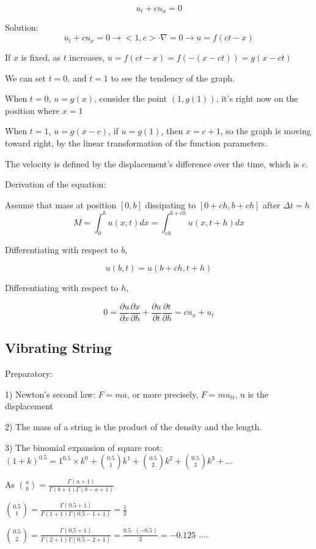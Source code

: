 \documentclass{article}
\begin{document}
$$u_t + cu_x = 0 $$

Solution:
$$u_t + cu_x = 0 \rightarrow <1,c> \cdot \nabla = 0 \rightarrow u = f(ct-x)$$

If $x$ is fixed, as $t$ increases, $u=f(ct-x) = f(-(x-ct)) = g(x-ct)$

We can set $t=0$, and $t = 1$ to see the tendency of the graph.

When $t =0$, $u = g(x)$, consider the point $(1,g(1))$, it's right now on the position where $x=1$

When $t =1$, $u = g(x-c)$, if $u = g(1)$, then $x = c+1$, so the graph is moving toward right, by the linear transformation of the function parameters.

The velocity is defined by the displacement's difference over the time, which is $c$.

Derivation of the equation:

Assume that mass at position $[0,b]$ dissipating to $[0+ch,b+ch]$ after $\Delta t = h$
$$M = \int_0^b u(x,t) dx = \int_{ch}^{b+ch} u(x,t+h) dx $$

Differentiating with respect to $b$,

$$ u(b,t)  =  u(b+ch,t+ h) $$

Differentiating with respect to $h$,

$$ 0 = \frac{\partial u}{\partial x}\frac{\partial x}{\partial h} + \frac{\partial u}{\partial t}\frac{\partial t}{\partial h}= cu_x+u_t$$



\subsection{Vibrating String}

Preparatory:

1) Newton's second law: $F = ma$, or more precisely, $F = mu_{tt}$, u is the displacement

2) The mass of a string is the product of the density and the length.

3) The binomial expansion of square root: $(1+k)^{0.5} = 1^{0.5} \times k^0 + {0.5 \choose 1} k^1 + {0.5 \choose 2} k^2 + {0.5 \choose 3} k^3 + ...  $

As ${a \choose b} = \frac{\Gamma(a+1)}{\Gamma(b+1)\Gamma(b-a+1)}$

${0.5 \choose 1} = \frac{\Gamma(0.5+1)}{\Gamma(1+1)\Gamma(0.5-1+1)} = \frac{1}{2}$

${0.5 \choose 2} = \frac{\Gamma(0.5+1)}{\Gamma(2+1)\Gamma(0.5-2+1)} = \frac{0.5 \cdot (-0.5)}{2} = -0.125$
....
\end{document}
